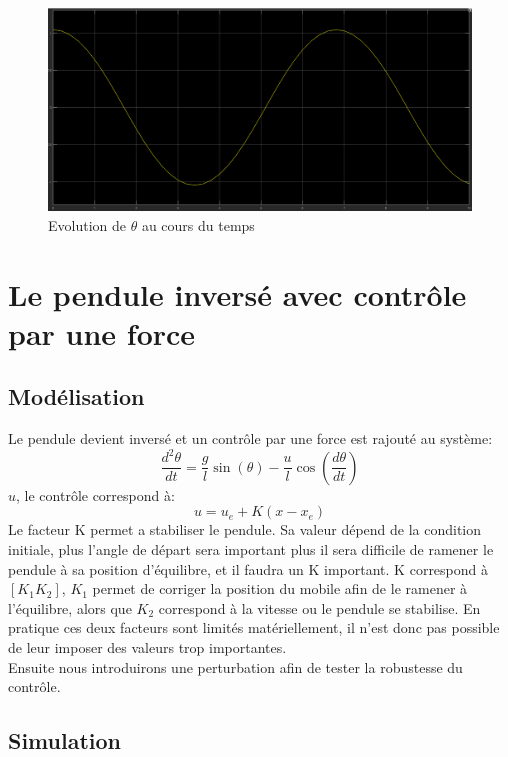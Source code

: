 \documentclass[11pt]{article}
\begin{document}
\begin{figure}[H]
	\includegraphics[scale=0.3]{images/pendule_simple_graph}
	\caption{Evolution de $\theta$ au cours du temps}
	\label{simu_pendule}
\end{figure}

\section{Le pendule inversé avec contrôle par une force}
\subsection{Modélisation} 
Le pendule devient inversé et un contrôle par une force est rajouté au système:
\begin{equation}
	\frac{d^2\theta}{dt} = \frac{g}{l}\sin(\theta)-\frac{u}{l}\cos(\frac{d\theta}{dt})
\end{equation}
$u$, le contrôle correspond à:
\begin{equation}
	u=u_e+K(x-x_e)
\end{equation}
Le facteur K permet a stabiliser le pendule. Sa valeur dépend de la condition initiale, plus l'angle de départ sera important plus il sera difficile de ramener le pendule à sa position d'équilibre, et il faudra un K important. K correspond à $[K_1 K_2]$, $K_1$ permet de corriger la position du mobile afin de le ramener à l'équilibre, alors que $K_2$ correspond à la vitesse ou le pendule se stabilise. En pratique ces deux facteurs sont limités matériellement, il n'est donc pas possible de leur imposer des valeurs trop importantes. \\
Ensuite nous introduirons une perturbation afin de tester la robustesse du contrôle.
\subsection{Simulation}
\end{document}
